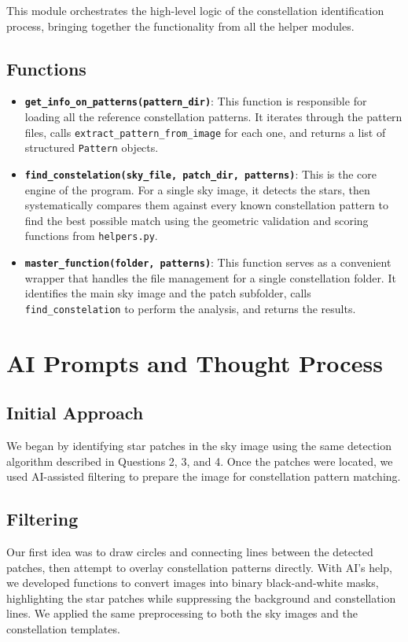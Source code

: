 \documentclass[a4paper,11pt]{article}
\begin{document}
	This module orchestrates the high-level logic of the constellation identification process, bringing together the functionality from all the helper modules.
	
	\subsection*{Functions}
	\begin{itemize}
		\item \textbf{\texttt{get\_info\_on\_patterns(pattern\_dir)}}: This function is responsible for loading all the reference constellation patterns. It iterates through the pattern files, calls \texttt{extract\_pattern\_from\_image} for each one, and returns a list of structured \texttt{Pattern} objects.
		\item \textbf{\texttt{find\_constelation(sky\_file, patch\_dir, patterns)}}: This is the core engine of the program. For a single sky image, it detects the stars, then systematically compares them against every known constellation pattern to find the best possible match using the geometric validation and scoring functions from \texttt{helpers.py}.
		\item \textbf{\texttt{master\_function(folder, patterns)}}: This function serves as a convenient wrapper that handles the file management for a single constellation folder. It identifies the main sky image and the patch subfolder, calls \texttt{find\_constelation} to perform the analysis, and returns the results.
	\end{itemize}
	
	
	\section{AI Prompts and Thought Process}
	
	\subsection{Initial Approach}
	We began by identifying star patches in the sky image using the same detection algorithm described in Questions 2, 3, and 4. Once the patches were located, we used AI-assisted filtering to prepare the image for constellation pattern matching.
	
	\subsection{Filtering}
	Our first idea was to draw circles and connecting lines between the detected patches, then attempt to overlay constellation patterns directly. With AI’s help, we developed functions to convert images into binary black-and-white masks, highlighting the star patches while suppressing the background and constellation lines. We applied the same preprocessing to both the sky images and the constellation templates.
	
\end{document}
